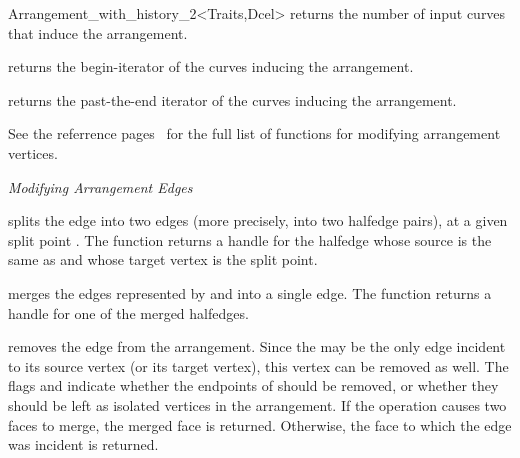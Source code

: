 \begin{ccRefClass}{Arrangement_with_history_2<Traits,Dcel>}
    {returns the number of input curves that induce the arrangement.}

    {returns the begin-iterator of the curves inducing the arrangement.}
    
    {returns the past-the-end iterator of the curves inducing the arrangement.}
    
\ccModifiers

See the  referrence
pages~ for the full
list of functions for modifying arrangement vertices.

{\sl Modifying Arrangement Edges}

  {splits the edge  into two edges (more precisely, into two halfedge
   pairs), at a given split point .
   The function returns a handle for the halfedge whose source is the same
   as  and whose target vertex is the split point.
   }

  {merges the edges represented by  and  into
   a single edge. 
   The function returns a handle for one of the merged halfedges.
   }

  {removes the edge  from the arrangement. Since the  may
   be the only edge incident to its source vertex (or its target vertex),
   this vertex can be removed as well. The flags  and
    indicate whether the endpoints of  should be
   removed, or whether they should be left as isolated vertices in the
   arrangement.
   If the operation causes two faces to merge, the merged face is returned.
   Otherwise, the face to which the edge was incident is returned.}

\ccSeeAlso
    \\
    \\
    \\

\end{ccRefClass}

\ccRefPageEnd
